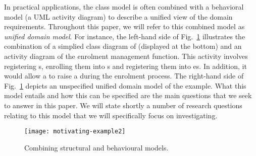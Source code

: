 In practical applications, the class model is often combined with a behavioral model (\eg a UML activity diagram) to describe a unified view of the domain requirements. Throughout this paper, we will refer to this combined model as \textit{unified domain model}. For instance, the left-hand side of Fig.~\ref{fig:motivatingExample2} illustrates the combination of a simplied class diagram of \courseman (displayed at the bottom) and an activity diagram of the enrolment management function. This activity involves registering s, enrolling them into s and registering them into es. In addition, it would allow a  to raise a  during the enrolment process. 
The right-hand side of Fig.~\ref{fig:motivatingExample2} depicts an unspecified unified domain model of the \courseman example. What this model entails and how this can be specified are the main questions that we seek to answer in this paper. We will state shortly a number of research questions relating to this model that we will specifically focus on investigating.

\begin{figure}[th]
\begin{center}
\texttt{[image: motivating-example2]}
\end{center}
\caption{Combining structural and behavioural \courseman models.}
\label{fig:motivatingExample2}
\end{figure}





